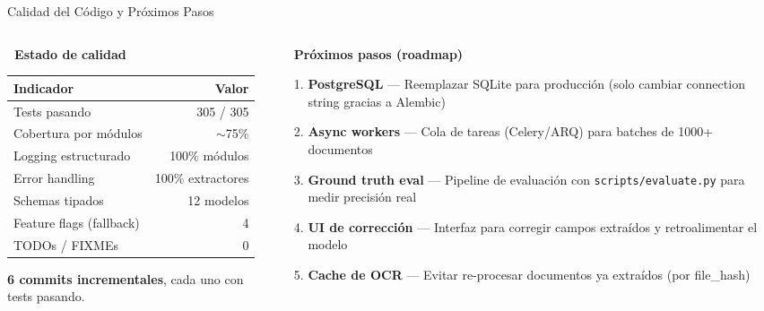 \documentclass[aspectratio=169,10pt]{beamer}
\begin{document}
\begin{frame}{Calidad del C\'odigo y Pr\'oximos Pasos}

\begin{columns}[T]
\begin{column}{0.50\textwidth}

\textbf{\ Estado de calidad}\\[6pt]
\begin{tabular}{lr}
\toprule
\textbf{Indicador} & \textbf{Valor} \\
\midrule
Tests pasando              & 305 / 305 \\
Cobertura por m\'odulos    & $\sim$75\% \\
Logging estructurado       & 100\% m\'odulos \\
Error handling             & 100\% extractores \\
Schemas tipados            & 12 modelos \\
Feature flags (fallback)   & 4 \\
TODOs / FIXMEs             & 0 \\
\bottomrule
\end{tabular}

\vspace{8pt}
\textbf{6 commits incrementales}, cada uno con tests pasando.

\end{column}
\begin{column}{0.50\textwidth}

\textbf{\ Pr\'oximos pasos (roadmap)}\\[6pt]

\begin{enumerate}\small
\item \textbf{PostgreSQL} --- Reemplazar SQLite para producci\'on (solo cambiar connection string gracias a Alembic)
\item \textbf{Async workers} --- Cola de tareas (Celery/ARQ) para batches de 1000+ documentos
\item \textbf{Ground truth eval} --- Pipeline de evaluaci\'on con \texttt{scripts/evaluate.py} para medir precisi\'on real
\item \textbf{UI de correcci\'on} --- Interfaz para corregir campos extra\'idos y retroalimentar el modelo
\item \textbf{Cache de OCR} --- Evitar re-procesar documentos ya extra\'idos (por file\_hash)
\end{enumerate}

\end{column}
\end{columns}

\end{frame}
\end{document}
